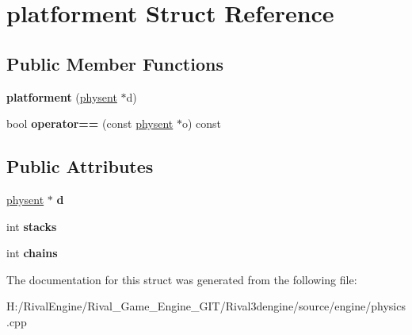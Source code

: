 \hypertarget{structplatforment}{}\section{platforment Struct Reference}
\label{structplatforment}
\subsection*{Public Member Functions}
\begin{DoxyCompactItemize}
\item 
\mbox{\label{structplatforment_a46822879dd9dc435e538d7454f029d6a}} 
{\bfseries platforment} (\hyperlink{structphysent}{physent} $\ast$d)
\item 
\mbox{\label{structplatforment_afdbcfe6b967ac6bc25923146a54f087a}} 
bool {\bfseries operator==} (const \hyperlink{structphysent}{physent} $\ast$o) const
\end{DoxyCompactItemize}
\subsection*{Public Attributes}
\begin{DoxyCompactItemize}
\item 
\mbox{\label{structplatforment_a225b1a52f137bf22549113d3ccb38db3}} 
\hyperlink{structphysent}{physent} $\ast$ {\bfseries d}
\item 
\mbox{\label{structplatforment_aadd5947129682fc9a5fb3241c0d6a6af}} 
int {\bfseries stacks}
\item 
\mbox{\label{structplatforment_af86e0773c1595336993f13a0f0193e4b}} 
int {\bfseries chains}
\end{DoxyCompactItemize}


The documentation for this struct was generated from the following file\+:\begin{DoxyCompactItemize}
\item 
H\+:/\+Rival\+Engine/\+Rival\+\_\+\+Game\+\_\+\+Engine\+\_\+\+G\+I\+T/\+Rival3dengine/source/engine/physics.\+cpp\end{DoxyCompactItemize}
